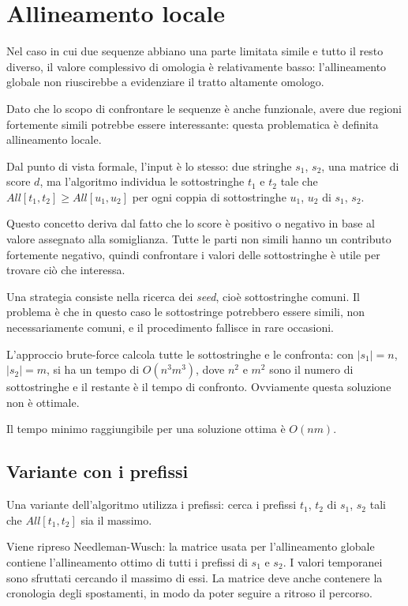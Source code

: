 \section{Allineamento locale}
Nel caso in cui due sequenze abbiano una parte limitata simile e tutto il resto diverso, il valore complessivo di omologia è relativamente basso: l'allineamento globale non riuscirebbe a evidenziare il tratto altamente omologo.

Dato che lo scopo di confrontare le sequenze è anche funzionale, avere due regioni fortemente simili potrebbe essere interessante: questa problematica è definita allineamento locale.

Dal punto di vista formale, l'input è lo stesso: due stringhe $s_1$, $s_2$, una matrice di score $d$, ma l'algoritmo individua le sottostringhe $t_1$ e $t_2$ tale che $All[t_1, t_2] \geq All[u_1, u_2]$ per ogni coppia di sottostringhe $u_1$, $u_2$ di $s_1$, $s_2$.

Questo concetto deriva dal fatto che lo score è positivo o negativo in base al valore assegnato alla somiglianza. Tutte le parti non simili hanno un contributo fortemente negativo, quindi confrontare i valori delle sottostringhe è utile per trovare ciò che interessa.

Una strategia consiste nella ricerca dei \textit{seed}, cioè sottostringhe comuni. Il problema è che in questo caso le sottostringe potrebbero essere simili, non necessariamente comuni, e il procedimento fallisce in rare occasioni. 

L'approccio brute-force calcola tutte le sottostringhe e le confronta: con $|s_1| = n$, $|s_2| = m$, si ha un tempo di $O(n^3m^3)$, dove $n^2$ e $m^2$ sono il numero di sottostringhe e il restante è il tempo di confronto. Ovviamente questa soluzione non è ottimale. 

Il tempo minimo raggiungibile per una soluzione ottima è $O(nm)$.

\subsection{Variante con i prefissi}
Una variante dell'algoritmo utilizza i prefissi: cerca i prefissi $t_1$, $t_2$ di $s_1$, $s_2$ tali che $All[t_1, t_2]$ sia il massimo.

Viene ripreso Needleman-Wusch: la matrice usata per l'allineamento globale contiene l'allineamento ottimo di tutti i prefissi di $s_1$ e $s_2$. I valori temporanei sono sfruttati cercando il massimo di essi. La matrice deve anche contenere la cronologia degli spostamenti, in modo da poter seguire a ritroso il percorso. 

